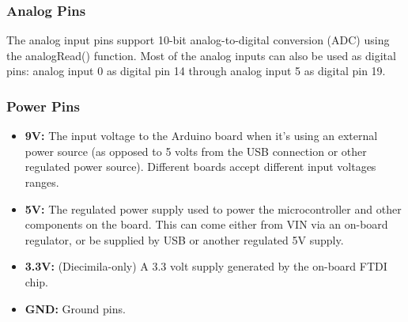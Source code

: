         \subsubsection{Analog Pins}
        The analog input pins support 10-bit analog-to-digital conversion (ADC) using the analogRead()
        function. Most of the analog inputs can also be used as digital pins: analog input 0 as digital pin 14
        through analog input 5 as digital pin 19.

        \subsubsection{Power Pins}
        \begin{itemize}
            \item \textbf{9V:} The input voltage to the Arduino board when it’s using an external power source (as opposed
            to 5 volts from the USB connection or other regulated power source). Different boards accept
            different input voltages ranges.
            \item \textbf{5V:} The regulated power supply used to power the microcontroller and other components on
            the board. This can come either from VIN via an on-board regulator, or be supplied by USB or
            another regulated 5V supply.
            \item \textbf{3.3V:} (Diecimila-only) A 3.3 volt supply generated by the on-board FTDI chip. 
                \item \textbf{GND:} Ground pins.
        \end{itemize}
        
        
    




